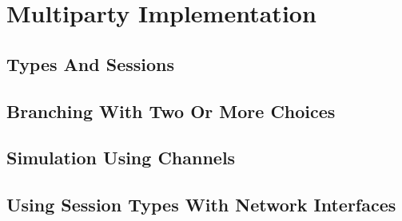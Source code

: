 \section{Multiparty Implementation}

\subsection{Types And Sessions}

\subsection{Branching With Two Or More Choices}

\subsection{Simulation Using Channels}

\subsection{Using Session Types With Network Interfaces}
